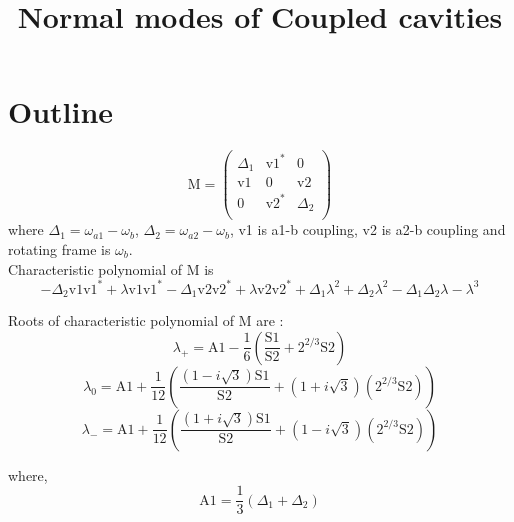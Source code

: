\documentclass{article}
\title{Normal modes of Coupled cavities}
\author{}
\date{}
\begin{document}
\maketitle

\section{Outline}

\begin{equation}
\text{M}=\left(
\begin{array}{ccc}
 \Delta _1 & \text{v1}^* & 0 \\
 \text{v1} & 0 & \text{v2} \\
 0 & \text{v2}^* & \Delta _2 \\
\end{array}
\right)
\end{equation}
where $\Delta _1= \omega_{a1}-\omega_{b}$, $\Delta _2= \omega_{a2}-\omega_{b}$, v1 is a1-b coupling, v2 is a2-b coupling and rotating frame is $\omega_b$.\\

Characteristic polynomial of M is
\begin{equation}
-\Delta _2 \text{v1} \text{v1}^*+\lambda  \text{v1} \text{v1}^*-\Delta _1 \text{v2} \text{v2}^*+\lambda  \text{v2} \text{v2}^*+\Delta _1 \lambda ^2+\Delta _2 \lambda ^2-\Delta _1 \Delta _2 \lambda -\lambda ^3
    \end{equation}

Roots of characteristic polynomial of M are :
 \begin{equation}
\text{$\lambda_+$}=\text{A1}-\frac{1}{6} \left(\frac{\text{S1}}{\text{S2}}+2^{2/3} \text{S2}\right) 
\end{equation}
 \begin{equation}
\text{$\lambda_0$}=\text{A1}+\frac{1}{12} \left(\frac{\left(1-i \sqrt{3}\right) \text{S1}}{\text{S2}}+\left(1+i \sqrt{3}\right) \left(2^{2/3} \text{S2}\right)\right)
\end{equation}
 \begin{equation}
\text{$\lambda_-$}=\text{A1}+\frac{1}{12} \left(\frac{\left(1+i \sqrt{3}\right) \text{S1}}{\text{S2}}+\left(1-i \sqrt{3}\right) \left(2^{2/3} \text{S2}\right)\right) 
\end{equation}


where, 
\begin{equation}
    \text{A1}=\frac{1}{3} \left(\Delta _1+\Delta _2\right) 
\end{equation}
\end{document}
